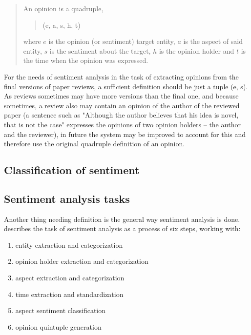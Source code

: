 \begin{quote}
An opinion is a quadruple,\begin{quote} (e, a, s, h, t)\end{quote}where $e$ is the opinion (or sentiment) target entity, $a$ is the aspect of said entity, $s$ is the sentiment about the target, $h$ is the opinion holder and $t$ is the time when the opinion was expressed. 
\end{quote}
For the needs of sentiment analysis in the task of extracting opinions from the final versions of paper reviews, a sufficient definition should be just a tuple (e, s). As reviews sometimes may have more versions than the final one, and because sometimes, a review also may contain an opinion of the author of the reviewed paper (a sentence such as "Although the author believes that his idea is novel, that is not the case" expresses the opinions of two opinion holders -- the author and the reviewer), in future the system may be improved to account for this and therefore use the original quadruple definition of an opinion.
\subsection{Classification of sentiment}

\subsection{Sentiment analysis tasks}

Another thing needing definition is the general way sentiment analysis is done.
\textcite{liu_2015} describes the task of sentiment analysis as a process of six steps, working with:
\begin{enumerate}
    \item entity extraction and categorization
    \item opinion holder extraction and categorization
    \item aspect extraction and categorization
    \item time extraction and standardization
    \item aspect sentiment classification
    \item opinion quintuple generation
\end{enumerate}

